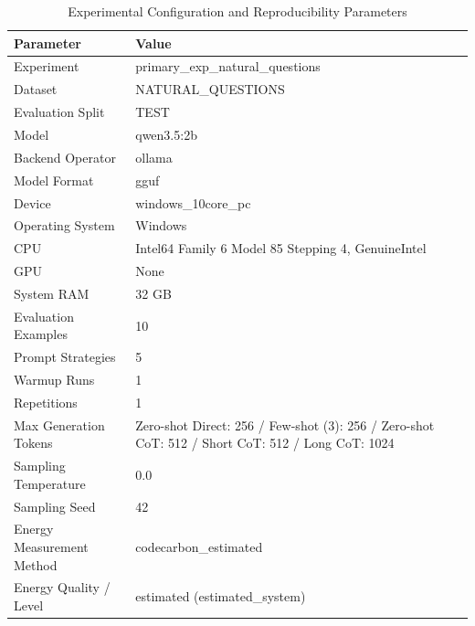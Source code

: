 \begin{table}
\caption{Experimental Configuration and Reproducibility Parameters}
\label{tab:experimental_configuration}
\begin{tabular}{ll}
\toprule
Parameter & Value \\
\midrule
Experiment & primary\_exp\_natural\_questions \\
Dataset & NATURAL\_QUESTIONS \\
Evaluation Split & TEST \\
Model & qwen3.5:2b \\
Backend Operator & ollama \\
Model Format & gguf \\
Device & windows\_10core\_pc \\
Operating System & Windows \\
CPU & Intel64 Family 6 Model 85 Stepping 4, GenuineIntel \\
GPU & None \\
System RAM & 32 GB \\
Evaluation Examples & 10 \\
Prompt Strategies & 5 \\
Warmup Runs & 1 \\
Repetitions & 1 \\
Max Generation Tokens & Zero-shot Direct: 256 / Few-shot (3): 256 / Zero-shot CoT: 512 / Short CoT: 512 / Long CoT: 1024 \\
Sampling Temperature & 0.0 \\
Sampling Seed & 42 \\
Energy Measurement Method & codecarbon\_estimated \\
Energy Quality / Level & estimated (estimated\_system) \\
\bottomrule
\end{tabular}
\end{table}

